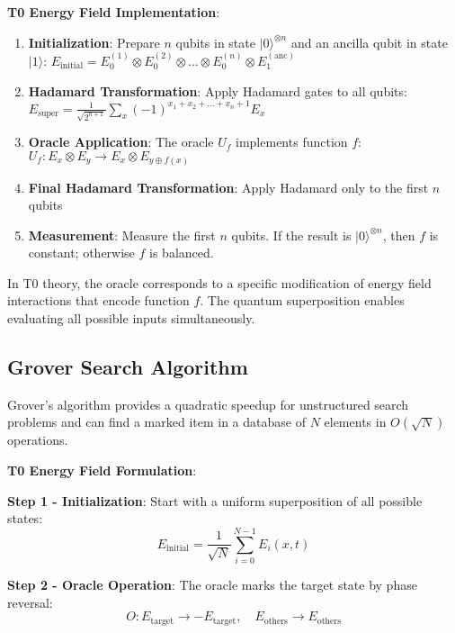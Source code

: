 \documentclass[12pt,a4paper]{article}
\theoremstyle{definition}
\theoremstyle{remark}
\begin{document}
	\textbf{T0 Energy Field Implementation}:
	\begin{enumerate}
		\item \textbf{Initialization}: Prepare $n$ qubits in state $|0\rangle^{\otimes n}$ and an ancilla qubit in state $|1\rangle$:
		$E_{\text{initial}} = E_0^{(1)} \otimes E_0^{(2)} \otimes \ldots \otimes E_0^{(n)} \otimes E_1^{(\text{anc})}$
		
		\item \textbf{Hadamard Transformation}: Apply Hadamard gates to all qubits:
		$E_{\text{super}} = \frac{1}{\sqrt{2^{n+1}}} \sum_{x} (-1)^{x_1 + x_2 + \ldots + x_n + 1} E_x$
		
		\item \textbf{Oracle Application}: The oracle $U_f$ implements function $f$:
		$U_f: E_x \otimes E_y \rightarrow E_x \otimes E_{y \oplus f(x)}$
		
		\item \textbf{Final Hadamard Transformation}: Apply Hadamard only to the first $n$ qubits
		
		\item \textbf{Measurement}: Measure the first $n$ qubits. If the result is $|0\rangle^{\otimes n}$, then $f$ is constant; otherwise $f$ is balanced.
	\end{enumerate}
	
	In T0 theory, the oracle corresponds to a specific modification of energy field interactions that encode function $f$. The quantum superposition enables evaluating all possible inputs simultaneously.
	
	\subsection{Grover Search Algorithm}
	
	Grover's algorithm provides a quadratic speedup for unstructured search problems and can find a marked item in a database of $N$ elements in $O(\sqrt{N})$ operations.
	
	\textbf{T0 Energy Field Formulation}:
	
	\textbf{Step 1 - Initialization}:
	Start with a uniform superposition of all possible states:
	\begin{equation}
		E_{\text{initial}} = \frac{1}{\sqrt{N}} \sum_{i=0}^{N-1} E_i(x,t)
	\end{equation}
	
	\textbf{Step 2 - Oracle Operation}:
	The oracle marks the target state by phase reversal:
	\begin{equation}
		O: E_{\text{target}} \rightarrow -E_{\text{target}}, \quad E_{\text{others}} \rightarrow E_{\text{others}}
	\end{equation}
	
\end{document}
